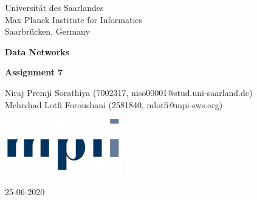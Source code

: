 \documentclass[fleqn]{article}
\begin{document}
\begin{titlepage}
	\clearpage\thispagestyle{empty}
	\centering
	\vspace{1cm}

	{\normalsize Universität des Saarlandes \\ 
		Max Planck Institute for Informatics \\
		Saarbrücken, Germany \par}
		\vspace{3cm}
	{\Huge \textbf{Data Networks}} \\
	\vspace{1cm}
	{\large \textbf{Assignment 7} \par}
	\vspace{4cm}
	{\normalsize Niraj Premji Sorathiya (7002317, niso00001@stud.uni-saarland.de)   \\ %
	             Mehrshad Lotfi Foroushani (2581840, mlotfi@mpi-sws.org)\par}
	\vspace{5cm}
    
    \centering \includegraphics[scale=0.6]{logo.png}
    
    \vspace{0.5cm}
		
	{\normalsize 25-06-2020 \par}
	
	\pagebreak

\end{titlepage}


    
    
    
\end{document}
